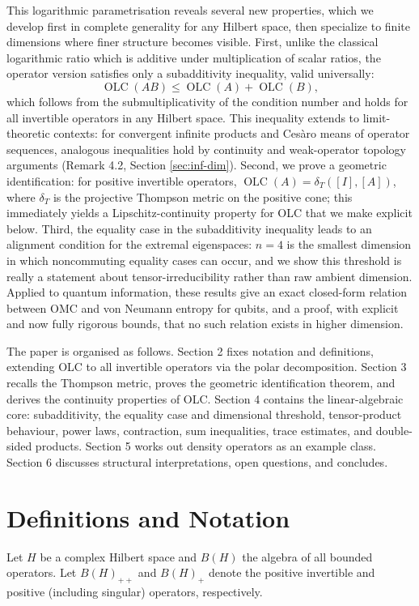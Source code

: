\documentclass{article}
\theoremstyle{remark}
\providecommand{\QLC}{\operatorname{OLC}}
\begin{document}
This logarithmic parametrisation reveals several new properties, which we develop first in complete generality for any Hilbert space, then specialize to finite dimensions where finer structure becomes visible. First, unlike the classical logarithmic ratio which is additive under multiplication of scalar ratios, the operator version satisfies only a subadditivity inequality, valid universally:
\[
\QLC(AB) \le \QLC(A) + \QLC(B),
\]
which follows from the submultiplicativity of the condition number and holds for all invertible operators in any Hilbert space. This inequality extends to limit-theoretic contexts: for convergent infinite products and Ces\`aro means of operator sequences, analogous inequalities hold by continuity and weak-operator topology arguments (Remark 4.2, Section \ref{sec:inf-dim}). Second, we prove a geometric identification: for positive invertible operators, $\QLC(A) = \delta_T([I],[A])$, where $\delta_T$ is the projective Thompson metric on the positive cone; this immediately yields a Lipschitz-continuity property for OLC that we make explicit below. Third, the equality case in the subadditivity inequality leads to an alignment condition for the extremal eigenspaces: $n=4$ is the smallest dimension in which noncommuting equality cases can occur, and we show this threshold is really a statement about tensor-irreducibility rather than raw ambient dimension. Applied to quantum information, these results give an exact closed-form relation between OMC and von Neumann entropy for qubits, and a proof, with explicit and now fully rigorous bounds, that no such relation exists in higher dimension.

The paper is organised as follows. Section 2 fixes notation and definitions, extending OLC to all invertible operators via the polar decomposition. Section 3 recalls the Thompson metric, proves the geometric identification theorem, and derives the continuity properties of OLC. Section 4 contains the linear-algebraic core: subadditivity, the equality case and dimensional threshold, tensor-product behaviour, power laws, contraction, sum inequalities, trace estimates, and double-sided products. Section 5 works out density operators as an example class. Section 6 discusses structural interpretations, open questions, and concludes.


\section{Definitions and Notation}

Let $H$ be a complex Hilbert space and $B(H)$ the algebra of all bounded operators. Let $B(H)_{++}$ and $B(H)_+$ denote the positive invertible and positive (including singular) operators, respectively.
\end{document}
